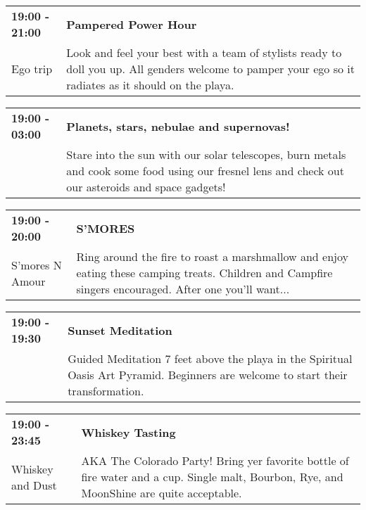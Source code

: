 \begin{tabular}{ p{1in} p{2.2in} }
    \textbf{19:00 - 21:00} & \textbf{Pampered Power Hour} \\
    Ego trip \newline  & Look and feel your best with a team of stylists ready to doll you up. All genders welcome to pamper your ego so it radiates as it should on the playa. \\
    \hline 
\end{tabular}
    
\begin{tabular}{ p{1in} p{2.2in} }
    \textbf{19:00 - 03:00} & \textbf{Planets, stars, nebulae and supernovas!} \\
    ~ \newline  & Stare into the sun with our solar telescopes, burn metals and cook some food using our fresnel lens and check out our asteroids and space gadgets! \\
    \hline 
\end{tabular}
    
\begin{tabular}{ p{1in} p{2.2in} }
    \textbf{19:00 - 20:00} & \textbf{S'MORES} \\
    S'mores N Amour \newline  & Ring around the fire to roast a marshmallow and enjoy eating these camping treats. Children and Campfire singers encouraged. After one you'll want... \\
    \hline 
\end{tabular}
    
\begin{tabular}{ p{1in} p{2.2in} }
    \textbf{19:00 - 19:30} & \textbf{Sunset Meditation} \\
    ~ \newline  & Guided Meditation 7 feet above the playa in the Spiritual Oasis Art Pyramid. Beginners are welcome to start their transformation. \\
    \hline 
\end{tabular}
    
\begin{tabular}{ p{1in} p{2.2in} }
    \textbf{19:00 - 23:45} & \textbf{Whiskey Tasting} \\
    Whiskey and Dust \newline  & AKA The Colorado Party! Bring yer favorite bottle of fire water and a cup. Single malt, Bourbon, Rye, and MoonShine are quite acceptable. \\
    \hline 
\end{tabular}
    
